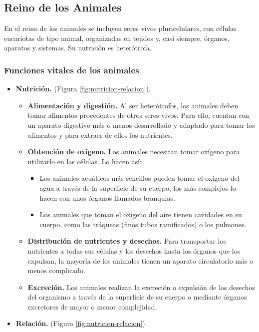 \subsection{Reino de los Animales}

En el reino de los animales se incluyen seres vivos pluricelulares, con células eucariotas de tipo animal, organizadas en tejidos y, casi siempre, órganos, aparatos y sistemas. Su nutrición es heterótrofa.

\subsubsection{Funciones vitales de los animales}
\begin{itemize}
    \item \textbf{Nutrición.} (Figura \ref{fig:nutricion-relacion}).
    \begin{itemize}
        \item \textbf{Alimentación y digestión.} Al ser heterótrofos, los animales deben tomar alimentos procedentes de otros seres vivos. Para ello, cuentan con un aparato digestivo más o menos desarrollado y adaptado para tomar los alimentos y para extraer de ellos los nutrientes.
        \item \textbf{Obtención de oxígeno.} Los animales necesitan tomar oxígeno para utilizarlo en las células. Lo hacen así:
        \begin{itemize}
            \item Los animales acuáticos más sencillos pueden tomar el oxígeno del agua a través de la superficie de su cuerpo; los más complejos lo hacen con unos órganos llamados branquias.
            \item Los animales que toman el oxígeno del aire tienen cavidades en su cuerpo, como las tráqueas (finos tubos ramificados) o los pulmones.
        \end{itemize}
        \item \textbf{Distribución de nutrientes y desechos.} Para transportar los nutrientes a todas sus células y los desechos hasta los órganos que los expulsan, la mayoría de los animales tienen un aparato circulatorio más o menos complicado.
        \item \textbf{Excreción.} Los animales realizan la excreción o expulsión de los desechos del organismo a través de la superficie de su cuerpo o mediante órganos excretores de mayor o menor complejidad.
    \end{itemize}
    \item \textbf{Relación.} (Figura \ref{fig:nutricion-relacion}).

\end{itemize}
